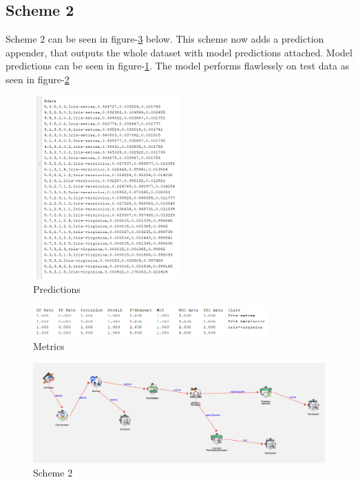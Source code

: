 \documentclass{article}
\begin{document}
\subsection*{Scheme 2}
Scheme 2 can be seen in figure-\ref{fig:scheme-2} below. This scheme now adds a prediction appender, that outputs the whole dataset with model predictions attached. Model predictions can be seen in figure-\ref{fig:predictions}. The model performs flawlessly on test data as seen in figure-\ref{fig:metrics-2}
\begin{figure}[H]
    \centering
    \includegraphics[width=0.5\textwidth]{predictions.png}
    \caption{Predictions}
    \label{fig:predictions}
\end{figure}
\begin{figure}[H]
    \centering
    \includegraphics[width=0.8\textwidth]{metrics-2.png}
    \caption{Metrics}
    \label{fig:metrics-2}
\end{figure}
\begin{figure}[H]
    \centering
    \includegraphics[width=1\textwidth]{config-2.png}
    \caption{Scheme 2}
    \label{fig:scheme-2}
\end{figure}
\end{document}
